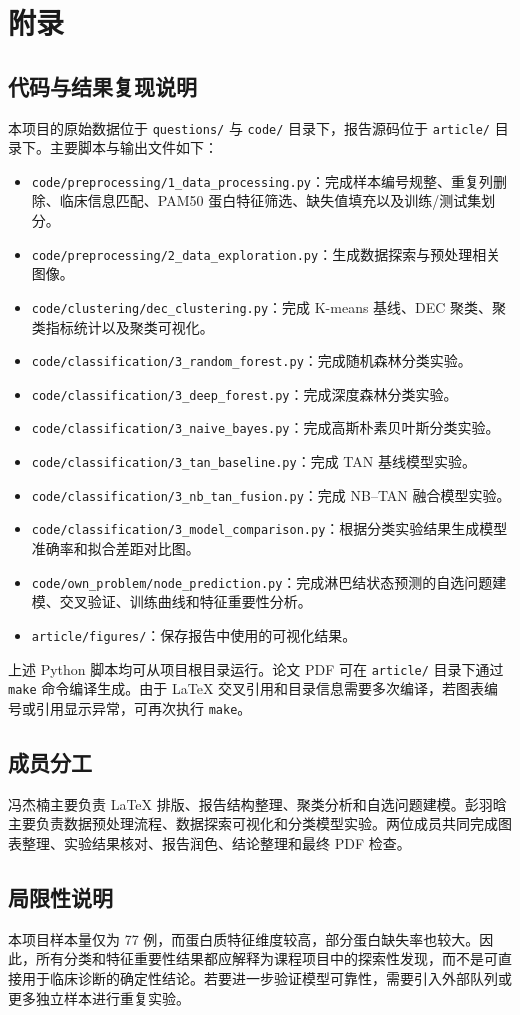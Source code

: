 \section*{附录}
\label{sec:appendix}

\subsection*{代码与结果复现说明}

本项目的原始数据位于 \texttt{questions/} 与 \texttt{code/} 目录下，报告源码位于 \texttt{article/} 目录下。主要脚本与输出文件如下：
\begin{itemize}
    \item \texttt{code/preprocessing/1\_data\_processing.py}：完成样本编号规整、重复列删除、临床信息匹配、PAM50 蛋白特征筛选、缺失值填充以及训练/测试集划分。
    \item \texttt{code/preprocessing/2\_data\_exploration.py}：生成数据探索与预处理相关图像。
    \item \texttt{code/clustering/dec\_clustering.py}：完成 K-means 基线、DEC 聚类、聚类指标统计以及聚类可视化。
    \item \texttt{code/classification/3\_random\_forest.py}：完成随机森林分类实验。
    \item \texttt{code/classification/3\_deep\_forest.py}：完成深度森林分类实验。
    \item \texttt{code/classification/3\_naive\_bayes.py}：完成高斯朴素贝叶斯分类实验。
    \item \texttt{code/classification/3\_tan\_baseline.py}：完成 TAN 基线模型实验。
    \item \texttt{code/classification/3\_nb\_tan\_fusion.py}：完成 NB--TAN 融合模型实验。
    \item \texttt{code/classification/3\_model\_comparison.py}：根据分类实验结果生成模型准确率和拟合差距对比图。
    \item \texttt{code/own\_problem/node\_prediction.py}：完成淋巴结状态预测的自选问题建模、交叉验证、训练曲线和特征重要性分析。
    \item \texttt{article/figures/}：保存报告中使用的可视化结果。
\end{itemize}

上述 Python 脚本均可从项目根目录运行。论文 PDF 可在 \texttt{article/} 目录下通过 \texttt{make} 命令编译生成。由于 LaTeX 交叉引用和目录信息需要多次编译，若图表编号或引用显示异常，可再次执行 \texttt{make}。

\subsection*{成员分工}

冯杰楠主要负责 LaTeX 排版、报告结构整理、聚类分析和自选问题建模。彭羽晗主要负责数据预处理流程、数据探索可视化和分类模型实验。两位成员共同完成图表整理、实验结果核对、报告润色、结论整理和最终 PDF 检查。

\subsection*{局限性说明}

本项目样本量仅为 77 例，而蛋白质特征维度较高，部分蛋白缺失率也较大。因此，所有分类和特征重要性结果都应解释为课程项目中的探索性发现，而不是可直接用于临床诊断的确定性结论。若要进一步验证模型可靠性，需要引入外部队列或更多独立样本进行重复实验。
